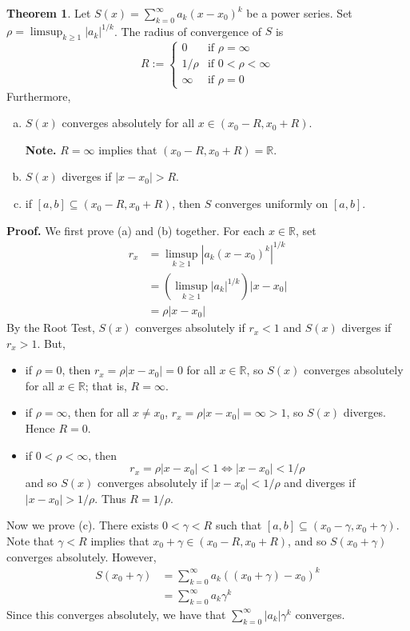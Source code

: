 \documentclass[11pt]{article}
\theoremstyle{definition}
\newtheorem{thm}{Theorem}[section]
\newcommand{\mbR}{\ensuremath{\mathbb{R}}}
\begin{document}
\begin{thm}
Let $S(x) = \sum_{k=0}^\infty a_k(x-x_0)^k$ be a power series. Set $\rho = \limsup_{k\geq1} |a_k|^{1/k}$. The radius of convergence of $S$ is
$$R := \begin{cases} 0 & \text{if } \rho = \infty \\ 
					1/\rho & \text{if } 0 < \rho < \infty \\ 
					\infty & \text{if } \rho = 0 \end{cases}$$
Furthermore,
\begin{enumerate}[(a)] \vspace{-0.2cm}
\item $S(x)$ converges absolutely for all $x \in (x_0 - R, x_0 + R)$. 

\textbf{Note.} $R = \infty$ implies that $(x_0 - R, x_0 + R) = \mbR$.

\item $S(x)$ diverges if $|x - x_0| > R$.
\item if $[a, b] \subseteq (x_0 - R, x_0 + R)$, then $S$ converges uniformly on $[a, b]$.
\end{enumerate}
\end{thm}
\textbf{Proof.} We first prove (a) and (b) together. For each $x \in \mbR$, set
\begin{align*}
r_x & = \limsup_{k\geq1} |a_k(x-x_0)^k|^{1/k} \\
& = \left( \limsup_{k\geq1} |a_k|^{1/k} \right)|x-x_0| \\
& = \rho|x-x_0|
\end{align*}
By the Root Test, $S(x)$ converges absolutely if $r_x < 1$ and $S(x)$ diverges if $r_x > 1$. But,
\begin{itemize} \vspace{-0.2cm}
\item if $\rho = 0$, then $r_x = \rho|x-x_0| = 0$ for all $x \in \mbR$, so $S(x)$ converges absolutely for all $x \in \mbR$; that is, $R = \infty$.
\item if $\rho = \infty$, then for all $x \ne x_0$, $r_x = \rho|x - x_0| = \infty > 1$, so $S(x)$ diverges. Hence $R = 0$.
\item if $0 < \rho < \infty$, then
$$r_x = \rho|x - x_0| < 1 \iff |x - x_0| < 1/\rho$$
and so $S(x)$ converges absolutely if $|x - x_0| < 1/\rho$ and diverges if $|x - x_0| > 1/\rho$. Thus $R = 1/\rho$.
\end{itemize}
Now we prove (c). There exists $0 < \gamma < R$ such that $[a, b] \subseteq (x_0 - \gamma, x_0 + \gamma)$. Note that $\gamma < R$ implies that $x_0 + \gamma \in (x_0 - R, x_0 + R)$, and so $S(x_0 + \gamma)$ converges absolutely. However,
\begin{align*}
S(x_0 + \gamma) & = \sum_{k=0}^\infty a_k \left( (x_0 + \gamma) - x_0 \right)^k \\
& = \sum_{k=0}^\infty a_k \gamma^k
\end{align*}
Since this converges absolutely, we have that $\sum_{k=0}^\infty |a_k| \gamma^k$ converges.
\end{document}
